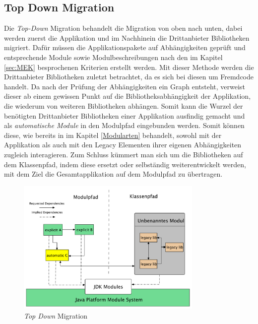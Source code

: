 \subsection{Top Down Migration}
	Die \textit{Top-Down} Migration behandelt die Migration von oben nach unten, dabei werden zuerst die Applikation und im Nachhinein die Drittanbieter Bibliotheken migriert. Dafür müssen die Applikationspakete auf Abhängigkeiten geprüft und entsprechende Module sowie Modulbeschreibungen nach den im Kapitel \ref{sec:MEK} besprochenen Kriterien erstellt werden. Mit dieser Methode werden die Drittanbieter Bibliotheken zuletzt betrachtet, da es sich bei diesen um Fremdcode handelt. \newline
	Da nach der Prüfung der Abhängigkeiten ein Graph entsteht, verweist dieser ab einem gewissen Punkt auf die Bibliotheksabhängigkeit der Applikation, die wiederum von weiteren Bibliotheken abhängen. Somit kann die Wurzel der benötigten Drittanbieter Bibliotheken einer Applikation ausfindig gemacht und als \textit{automatische Module} in den Modulpfad eingebunden werden. Somit können diese, wie bereits in im Kapitel \ref{Modularten} behandelt, sowohl mit der Applikation als auch mit den Legacy Elementen ihrer eigenen Abhängigkeiten zugleich interagieren. Zum Schluss kümmert man sich um die Bibliotheken auf dem Klassenpfad, indem diese ersetzt oder selbständig weiterentwickelt werden, mit dem Ziel die Gesamtapplikation auf dem Modulpfad zu übertragen. \cite{javaMod9,modulProgJava9,java9modRevealed,modulMitJava9,masteringJava9}\bigbreak
	\begin{figure}[h]
		\centering
	    \includegraphics[width=0.8\textwidth]{material/images/top-down-migrate.pdf}
	    \caption{\textit{Top Down} Migration}
	    \label{fig:TDM}
  	\end{figure}

